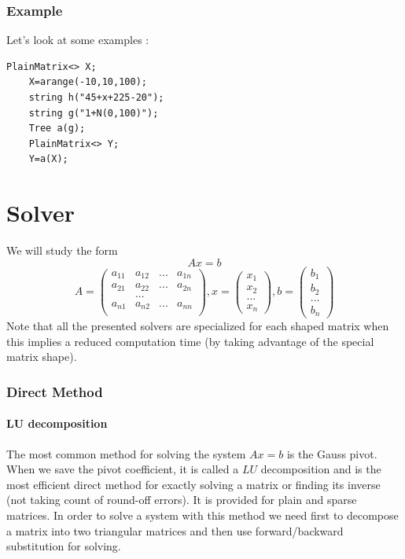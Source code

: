 \documentclass[a4paper]{report}
\begin{document}
\section{Example}
Let's look at some examples :
\begin{lstlisting}[basicstyle=\tiny]
    PlainMatrix<> X;
    X=arange(-10,10,100);
    string h("45+x+225-20");
    string g("1+N(0,100)");
    Tree a(g);
    PlainMatrix<> Y;
    Y=a(X);
\end{lstlisting}

\part{Solver}

We will study the form
\[
Ax=b
\]
\[
A=\left( \begin{matrix}
a_{11}& a_{12} & ... & a_{1n}\\
a_{21}& a_{22} & ... & a_{2n}\\
&...&&\\
a_{n1}&a_{n2}&...&a_{nn}\\
\end{matrix} \right),
x=\left( \begin{matrix}
x_1\\
x_2\\
...\\
x_n
\end{matrix} \right),
b=\left(
\begin{matrix}
b_1\\
b_2\\
...\\
b_n
\end{matrix}
\right)
\]
Note that all the presented solvers are specialized for each shaped matrix when this implies a reduced computation time (by taking advantage of the special matrix shape).

\section{Direct Method}

\subsection{LU decomposition}
The most common method for solving the system $Ax=b$ is the Gauss pivot. When we save the pivot coefficient, it is called a $LU$ decomposition and is the most efficient direct method for exactly solving a matrix or finding its inverse (not taking count of round-off errors). It is provided for plain and sparse matrices. In order to solve a system with this method we need first to decompose a matrix into two triangular matrices and then use forward/backward substitution for solving.
\end{document}
